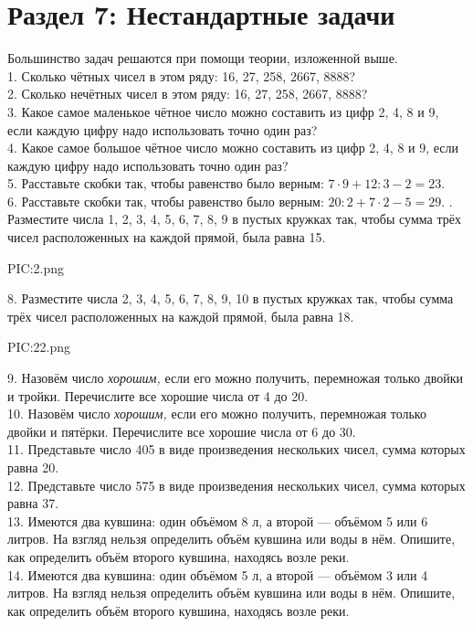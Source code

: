 \section{Раздел 7: Нестандартные задачи}
Большинство задач решаются при помощи теории, изложенной выше.\\
1. Сколько чётных чисел в этом ряду: 16, 27, 258, 2667, 8888?\\
2. Сколько нечётных чисел в этом ряду: 16, 27, 258, 2667, 8888?\\
3. Какое самое маленькое чётное число можно составить из цифр 2, 4, 8 и 9, если каждую цифру надо использовать точно один раз?\\
4. Какое самое большое чётное число можно составить из цифр 2, 4, 8 и 9, если каждую цифру надо использовать точно один раз?\\
5. Расставьте скобки так, чтобы равенство было верным: $7\cdot9+12:3-2=23.$\\
6. Расставьте скобки так, чтобы равенство было верным: $20:2+7\cdot2-5=29.$
\newpage
{}. Разместите числа 1, 2, 3, 4, 5, 6, 7, 8, 9 в пустых кружках так, чтобы сумма трёх чисел расположенных на каждой прямой, была равна 15.
\begin{center}
{{PIC:2.png}}
\end{center}
8. Разместите числа 2, 3, 4, 5, 6, 7, 8, 9, 10 в пустых кружках так, чтобы сумма трёх чисел расположенных на каждой прямой, была равна 18.
\begin{center}
{{PIC:22.png}}
\end{center}
9. Назовём число {\it хорошим,} если его можно получить, перемножая только двойки и тройки. Перечислите все хорошие числа от 4 до 20.\\
10. Назовём число {\it хорошим,} если его можно получить, перемножая только двойки и пятёрки. Перечислите все хорошие числа от 6 до 30.\\
11. Представьте число 405 в виде произведения нескольких чисел, сумма которых равна 20.\\
12. Представьте число 575 в виде произведения нескольких чисел, сумма которых равна 37.\\
13. Имеются два кувшина: один объёмом 8 л, а второй --- объёмом 5 или 6 литров. На взгляд нельзя определить объём кувшина или воды в нём. Опишите, как определить объём второго кувшина, находясь возле реки.\\
14. Имеются два кувшина: один объёмом 5 л, а второй --- объёмом 3 или 4 литров. На взгляд нельзя определить объём кувшина или воды в нём. Опишите, как определить объём второго кувшина, находясь возле реки.\\
